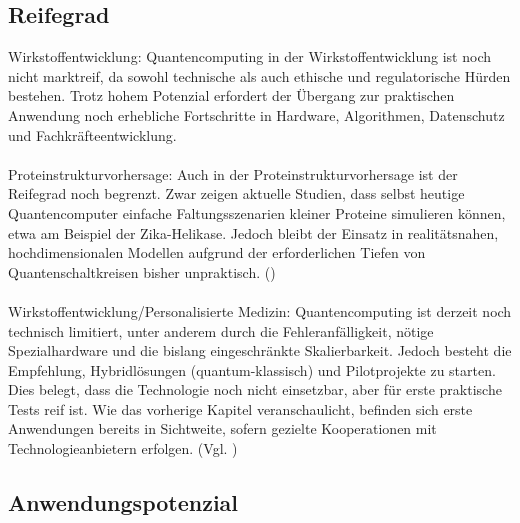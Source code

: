 \subsection{Reifegrad}
Wirkstoffentwicklung:
Quantencomputing in der Wirkstoffentwicklung ist noch nicht marktreif, da sowohl technische als auch ethische und regulatorische Hürden bestehen. Trotz hohem Potenzial erfordert der Übergang zur praktischen Anwendung noch erhebliche Fortschritte in Hardware, Algorithmen, Datenschutz und Fachkräfteentwicklung.\cite{flother_state_2023}\\
\\
Proteinstrukturvorhersage: Auch in der Proteinstrukturvorhersage ist der Reifegrad noch begrenzt. Zwar zeigen aktuelle Studien, dass selbst heutige Quantencomputer einfache Faltungsszenarien kleiner Proteine simulieren können, etwa am Beispiel der Zika-Helikase. Jedoch bleibt der Einsatz in realitätsnahen, hochdimensionalen Modellen aufgrund der erforderlichen Tiefen von Quantenschaltkreisen bisher unpraktisch. (\cite{doga_perspective_2024})\\
\\
Wirkstoffentwicklung/Personalisierte Medizin:
Quantencomputing ist derzeit noch technisch limitiert, unter anderem durch die Fehleranfälligkeit, nötige Spezialhardware und die bislang eingeschränkte Skalierbarkeit. Jedoch besteht die Empfehlung, Hybridlösungen (quantum-klassisch) und  Pilotprojekte zu starten. Dies belegt, dass die Technologie noch nicht einsetzbar, aber für erste praktische Tests reif ist. Wie das vorherige Kapitel veranschaulicht, befinden sich erste Anwendungen bereits in Sichtweite, sofern gezielte Kooperationen mit Technologieanbietern erfolgen. (Vgl. \cite{jeyaraman_revolutionizing_2024})

\subsection{Anwendungspotenzial}

